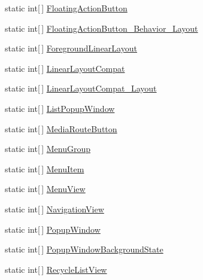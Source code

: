 \begin{CompactItemize}
\item 
static int\mbox{[}$\,$\mbox{]} \hyperlink{class__2doo_1_1_droid_1_1_resource_1_1_styleable_bf3e8d88f5af122063295160622c9926}{FloatingActionButton}
\item 
static int\mbox{[}$\,$\mbox{]} \hyperlink{class__2doo_1_1_droid_1_1_resource_1_1_styleable_9c91946a5c4c0437085d537a3f251c23}{FloatingActionButton\_\-Behavior\_\-Layout}
\item 
static int\mbox{[}$\,$\mbox{]} \hyperlink{class__2doo_1_1_droid_1_1_resource_1_1_styleable_24619e454ae63e5dffcbbe9f137ba9b7}{ForegroundLinearLayout}
\item 
static int\mbox{[}$\,$\mbox{]} \hyperlink{class__2doo_1_1_droid_1_1_resource_1_1_styleable_3b3358971e3da58535f799eefcfe1ead}{LinearLayoutCompat}
\item 
static int\mbox{[}$\,$\mbox{]} \hyperlink{class__2doo_1_1_droid_1_1_resource_1_1_styleable_6ff43061b423665ff49e8644665bba24}{LinearLayoutCompat\_\-Layout}
\item 
static int\mbox{[}$\,$\mbox{]} \hyperlink{class__2doo_1_1_droid_1_1_resource_1_1_styleable_7ad534213ba6cbbeeae75d5d93ebdc09}{ListPopupWindow}
\item 
static int\mbox{[}$\,$\mbox{]} \hyperlink{class__2doo_1_1_droid_1_1_resource_1_1_styleable_1a1411bac962b968538047d470349c12}{MediaRouteButton}
\item 
static int\mbox{[}$\,$\mbox{]} \hyperlink{class__2doo_1_1_droid_1_1_resource_1_1_styleable_44406f23b082b60311bda958f0f142a9}{MenuGroup}
\item 
static int\mbox{[}$\,$\mbox{]} \hyperlink{class__2doo_1_1_droid_1_1_resource_1_1_styleable_20b060ccb4e0c6070c73257a461b208a}{MenuItem}
\item 
static int\mbox{[}$\,$\mbox{]} \hyperlink{class__2doo_1_1_droid_1_1_resource_1_1_styleable_11e01693fea731f310733116d963371c}{MenuView}
\item 
static int\mbox{[}$\,$\mbox{]} \hyperlink{class__2doo_1_1_droid_1_1_resource_1_1_styleable_6ca2169b7cc4c0b8180a9ce142a02cf8}{NavigationView}
\item 
static int\mbox{[}$\,$\mbox{]} \hyperlink{class__2doo_1_1_droid_1_1_resource_1_1_styleable_3bf6fefd27d82f53af4e0e6fac006ec7}{PopupWindow}
\item 
static int\mbox{[}$\,$\mbox{]} \hyperlink{class__2doo_1_1_droid_1_1_resource_1_1_styleable_7f66ce9c9c08084ccd4856fab0b41977}{PopupWindowBackgroundState}
\item 
static int\mbox{[}$\,$\mbox{]} \hyperlink{class__2doo_1_1_droid_1_1_resource_1_1_styleable_4f73f4d4281760ee034b9357bbf6c6d2}{RecycleListView}

\end{CompactItemize}
